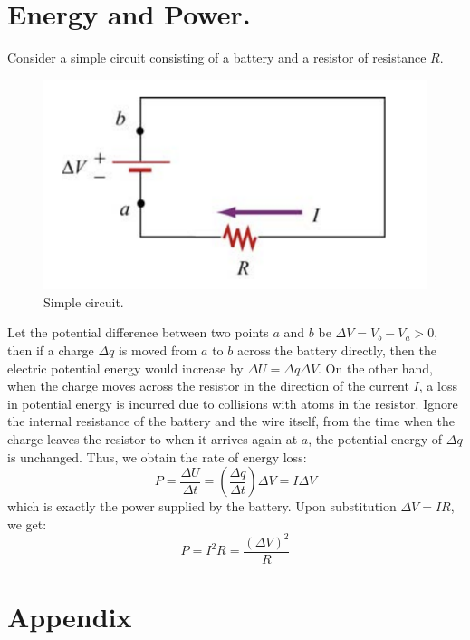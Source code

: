 \documentclass[11pt, letterpaper]{article}
\begin{document}
\section{Energy and Power.}
Consider a simple circuit consisting of a battery and a resistor of resistance $R$.
\begin{figure}[h!]
	\centering
	\includegraphics[scale=0.7]{circuit.png}
	\caption{Simple circuit.}
	\label{fig:circuit}
\end{figure}

Let the potential difference between two points $a$ and $b$ be $\Delta V = V_b - V_a > 0$, then if a charge $\Delta q$ is moved from $a$ to $b$ across the battery directly, then the electric potential energy would increase by $\Delta U = \Delta q\Delta V$. On the other hand, when the charge moves across the resistor in the direction of the current $I$, a loss in potential energy is incurred due to collisions with atoms in the resistor. Ignore the internal resistance of the battery and the wire itself, from the time when the charge leaves the resistor to when it arrives again at $a$, the potential energy of $\Delta q$ is unchanged. Thus, we obtain the rate of energy loss:
\begin{equation}
	\boxed{P = \frac{\Delta U}{\Delta t} = \left(\frac{\Delta q}{\Delta t}\right)\Delta V = I\Delta V}
\end{equation}
which is exactly the power supplied by the battery. Upon substitution $\Delta V = IR$, we get:
\begin{equation}
	\boxed{P = I^2R = \frac{(\Delta V)^2}{R}}
\end{equation}
\newpage

\section{Appendix}
\label{sec:app}
\end{document}
